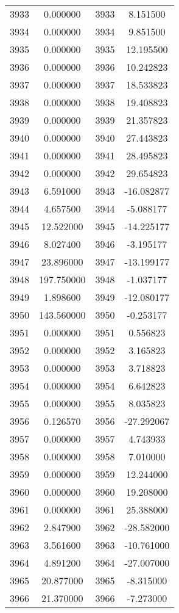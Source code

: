 \documentclass[12pt]{article}
\begin{document}
\begin{longtable}{@{}cccc@{}}
3933 & 0.000000 & 3933 & 8.151500 \\
3934 & 0.000000 & 3934 & 9.851500 \\
3935 & 0.000000 & 3935 & 12.195500 \\
3936 & 0.000000 & 3936 & 10.242823 \\
3937 & 0.000000 & 3937 & 18.533823 \\
3938 & 0.000000 & 3938 & 19.408823 \\
3939 & 0.000000 & 3939 & 21.357823 \\
3940 & 0.000000 & 3940 & 27.443823 \\
3941 & 0.000000 & 3941 & 28.495823 \\
3942 & 0.000000 & 3942 & 29.654823 \\
3943 & 6.591000 & 3943 & -16.082877 \\
3944 & 4.657500 & 3944 & -5.088177 \\
3945 & 12.522000 & 3945 & -14.225177 \\
3946 & 8.027400 & 3946 & -3.195177 \\
3947 & 23.896000 & 3947 & -13.199177 \\
3948 & 197.750000 & 3948 & -1.037177 \\
3949 & 1.898600 & 3949 & -12.080177 \\
3950 & 143.560000 & 3950 & -0.253177 \\
3951 & 0.000000 & 3951 & 0.556823 \\
3952 & 0.000000 & 3952 & 3.165823 \\
3953 & 0.000000 & 3953 & 3.718823 \\
3954 & 0.000000 & 3954 & 6.642823 \\
3955 & 0.000000 & 3955 & 8.035823 \\
3956 & 0.126570 & 3956 & -27.292067 \\
3957 & 0.000000 & 3957 & 4.743933 \\
3958 & 0.000000 & 3958 & 7.010000 \\
3959 & 0.000000 & 3959 & 12.244000 \\
3960 & 0.000000 & 3960 & 19.208000 \\
3961 & 0.000000 & 3961 & 25.388000 \\
3962 & 2.847900 & 3962 & -28.582000 \\
3963 & 3.561600 & 3963 & -10.761000 \\
3964 & 4.891200 & 3964 & -27.007000 \\
3965 & 20.877000 & 3965 & -8.315000 \\
3966 & 21.370000 & 3966 & -7.273000 \\

\end{longtable}
\end{document}
